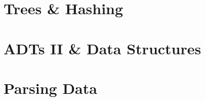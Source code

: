 










\chapter{Trees \& Hashing}










\chapter{ADTs II \& Data Structures }






\chapter{Parsing Data}

\newcommand{\bb}{white}
\newcommand{\ff}{black}

\newcommand{\sixel}[6]{%
\begin{tikzpicture}[scale=0.333, every node/.style={scale=0.333}]
\matrix[sixelstyle]
{
|[fill=#1]| \& |[fill=#2]| \\
|[fill=#3]| \& |[fill=#4]| \\
|[fill=#5]| \& |[fill=#6]| \\
};
\end{tikzpicture}%
}

\newcommand{\sepsix}[6]{%
\begin{tikzpicture}[scale=0.333, every node/.style={scale=0.333}]
\matrix[sepsixstyle]
{
|[fill=#1]| \& |[fill=#2]| \\
|[fill=#3]| \& |[fill=#4]| \\
|[fill=#5]| \& |[fill=#6]| \\
};
\end{tikzpicture}%
}




